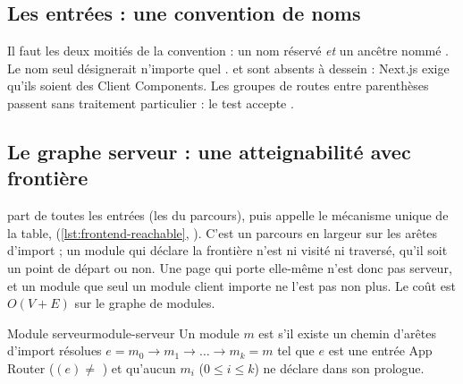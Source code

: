 \subsection{Les entrées : une convention de noms}


Il faut les deux moitiés de la convention : un nom réservé \emph{et} un ancêtre nommé
. Le nom seul désignerait n'importe quel .  et
 sont absents à dessein : Next.js exige qu'ils soient des Client Components.
Les groupes de routes entre parenthèses passent sans traitement particulier : le test
 accepte .

\subsection{Le graphe serveur : une atteignabilité avec frontière}


 part de toutes les entrées (les  du parcours), puis appelle le mécanisme unique
de la table, 
(\cref{lst:frontend-reachable}, ). C'est un parcours en largeur
sur les arêtes d'import ; un module qui déclare la frontière n'est ni visité ni traversé, qu'il
soit un point de départ ou non. Une page qui porte elle-même  n'est donc pas serveur,
et un module que seul un module client importe ne l'est pas non plus. Le coût est
$O(V + E)$ sur le graphe de modules.

\begin{definition}{Module serveur}{module-serveur}
Un module $m$ est  s'il existe un chemin d'arêtes d'import résolues
$e = m_0 \to m_1 \to \dots \to m_k = m$ tel que $e$ est une entrée App Router
($(e) \neq$ ) et qu'aucun $m_i$ ($0 \le i \le k$) ne déclare
 dans son prologue.
\end{definition}

